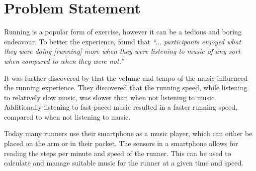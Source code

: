 \section{Problem Statement}
Running is a popular form of exercise, however it can be a tedious and boring endeavour.
To better the experience, \citet{musicRunEffectArticle} found that 
\textit{``... participants enjoyed what they were doing [running] more when they were listening to music of any sort when compared to when they were not.''}

It was further discovered by \citet{musicRunEffectArticle} that the volume and tempo of the music influenced the running experience.
They discovered that the running speed, while listening to relatively slow music, was slower than when not listening to music. Additionally listening to fast-paced music resulted in a faster running speed, compared to when not listening to music.

Today many runners use their smartphone as a music player, which can either be placed on the arm or in their pocket.
The sensors in a smartphone allows for reading the steps per minute and speed of the runner. This can be used to calculate and manage suitable music for the runner at a given time and speed.


